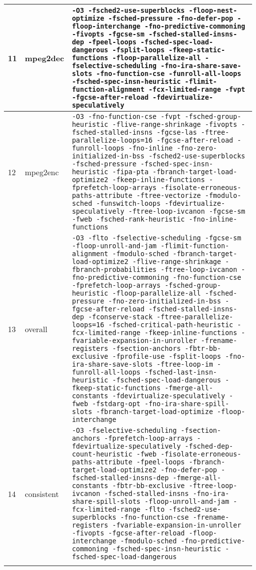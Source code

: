 \documentclass[twocolumn, 10pt]{article}
\begin{document}
\begin{tabularx}{\textwidth}{llX}
        \midrule
        11 & mpeg2dec & \texttt{-O3 -fsched2-use-superblocks -floop-nest-optimize -fsched-pressure -fno-defer-pop -floop-interchange -fno-predictive-commoning -fivopts -fgcse-sm -fsched-stalled-insns-dep -fpeel-loops -fsched-spec-load-dangerous -fsplit-loops -fkeep-static-functions -floop-parallelize-all -fselective-scheduling -fno-ira-share-save-slots -fno-function-cse -funroll-all-loops -fsched-spec-insn-heuristic -flimit-function-alignment -fcx-limited-range -fvpt -fgcse-after-reload -fdevirtualize-speculatively} \\
        \midrule
        12 & mpeg2enc & \texttt{-O3 -fno-function-cse -fvpt -fsched-group-heuristic -flive-range-shrinkage -fivopts -fsched-stalled-insns -fgcse-las -ftree-parallelize-loops=16 -fgcse-after-reload -funroll-loops -fno-inline -fno-zero-initialized-in-bss -fsched2-use-superblocks -fsched-pressure -fsched-spec-insn-heuristic -fipa-pta -fbranch-target-load-optimize2 -fkeep-inline-functions -fprefetch-loop-arrays -fisolate-erroneous-paths-attribute -ftree-vectorize -fmodulo-sched -funswitch-loops -fdevirtualize-speculatively -ftree-loop-ivcanon -fgcse-sm -fweb -fsched-rank-heuristic -fno-inline-functions} \\
        \midrule
        13 & overall & \texttt{-O3 -flto -fselective-scheduling -fgcse-sm -floop-unroll-and-jam -flimit-function-alignment -fmodulo-sched -fbranch-target-load-optimize2 -flive-range-shrinkage -fbranch-probabilities -ftree-loop-ivcanon -fno-predictive-commoning -fno-function-cse -fprefetch-loop-arrays -fsched-group-heuristic -floop-parallelize-all -fsched-pressure -fno-zero-initialized-in-bss -fgcse-after-reload -fsched-stalled-insns-dep -fconserve-stack -ftree-parallelize-loops=16 -fsched-critical-path-heuristic -fcx-limited-range -fkeep-inline-functions -fvariable-expansion-in-unroller -frename-registers -fsection-anchors -fbtr-bb-exclusive -fprofile-use -fsplit-loops -fno-ira-share-save-slots -ftree-loop-im -funroll-all-loops -fsched-last-insn-heuristic -fsched-spec-load-dangerous -fkeep-static-functions -fmerge-all-constants -fdevirtualize-speculatively -fweb -fstdarg-opt -fno-ira-share-spill-slots -fbranch-target-load-optimize -floop-interchange} \\
        \midrule
        14 & consistent & \texttt{-O3 -fselective-scheduling -fsection-anchors -fprefetch-loop-arrays -fdevirtualize-speculatively -fsched-dep-count-heuristic -fweb -fisolate-erroneous-paths-attribute -fpeel-loops -fbranch-target-load-optimize2 -fno-defer-pop -fsched-stalled-insns-dep -fmerge-all-constants -fbtr-bb-exclusive -ftree-loop-ivcanon -fsched-stalled-insns -fno-ira-share-spill-slots -floop-unroll-and-jam -fcx-limited-range -flto -fsched2-use-superblocks -fno-function-cse -frename-registers -fvariable-expansion-in-unroller -fivopts -fgcse-after-reload -floop-interchange -fmodulo-sched -fno-predictive-commoning -fsched-spec-insn-heuristic -fsched-spec-load-dangerous} \\
        \bottomrule
        \caption{Full flag sets, included in the appendix due to their length}
    \end{tabularx}
    \label{tab:flag_sets}
\end{document}
